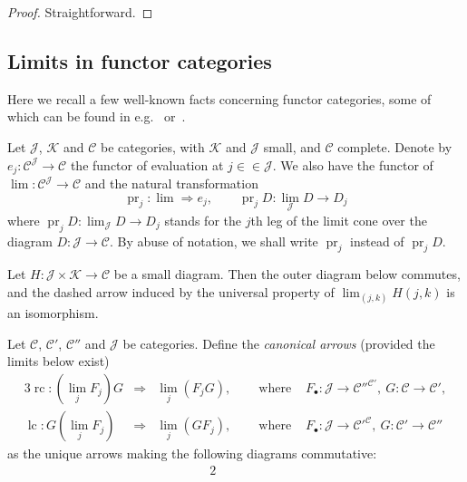 \documentclass[10pt]{simplearticle}
\newcommand{\tikzinput}[1]{}
\newcommand{\pr}{\operatorname{pr}}
\newcommand{\rc}{\operatorname{rc}}
\newcommand{\lc}{\operatorname{lc}}
\begin{document}
\begin{proof}
Straightforward.
\end{proof}

\subsection{Limits in functor categories}

Here
we recall a few well-known facts concerning
functor categories, some of which can be found in e.g.~\cite{Leinster2014basicCT}
or~\cite{Riehl2016CategoryInContext}.

Let $\mathcal{J}$, $\mathcal{K}$ and $\mathcal{C}$ be categories,
with $\mathcal{K}$ and $\mathcal{J}$ small, and $\mathcal{C}$ complete.
 Denote by $e_{j}\colon\mathcal{C}^{\mathcal{J}}\to\mathcal{C}$
the functor of evaluation at $j\in\in\mathcal{J}$. We also have the
functor of $\lim\colon\mathcal{C}^{\mathcal{J}}\to\mathcal{C}$ and
the natural transformation
\begin{equation}
\pr_{j}\colon\lim\Rightarrow e_{j},\qquad\pr_{j}D\colon\lim_{\mathcal{J}}D\to D_{j}\label{eq:lim-eval}
\end{equation}
where $\pr_{j}D\colon\lim_{\mathcal{J}}D\to D_{j}$ stands for the
$j$th leg of the limit cone over the diagram $D\colon\mathcal{J}\to\mathcal{C}$.
By abuse of notation, we shall write $\pr_{j}$ instead of $\pr_{j}D$.
\begin{lem}\label{lem:iter-lims}
Let $H\colon\mathcal{J}\times\mathcal{K}\to\mathcal{C}$
be a small diagram. Then the outer diagram below commutes,
\[
\tikzinput{d266}
\]
and the dashed arrow induced by the universal property of $\lim_{(j,k)}H(j,k)$
is an isomorphism.
\end{lem}

\begin{defn}\label{def:ab}
Let $\mathcal{C}$, $\mathcal{C}'$, $\mathcal{C}''$
and $\mathcal{J}$ be categories. Define the \emph{canonical arrows}
(provided the limits below exist)
\begin{alignat}{3}
\rc\colon(\lim_{j}F_{j})G & \Rightarrow & \lim_{j}(F_{j}G), &\ 
& \textrm{ where } & F_{\bullet}\colon\mathcal{J}\to\mathcal{C}''^{\mathcal{C}'},~G\colon\mathcal{C}\to\mathcal{C}',\label{eq:canar1}\\
\lc\colon G(\lim_{j}F_{j}) & \Rightarrow & \lim_{j}(GF_{j}), &\ 
& \textrm{ where } & F_{\bullet}\colon\mathcal{J}\to\mathcal{C}'^{\mathcal{C}},~G\colon\mathcal{C}'\to\mathcal{C}''\label{eq:canar11}
\end{alignat}
as the unique arrows making the following diagrams commutative:
\begin{alignat}{2}
\tikzinput{d226} & \qquad & \tikzinput{d310}\label{eq:canar2}
\end{alignat}
\end{defn}
\end{document}
